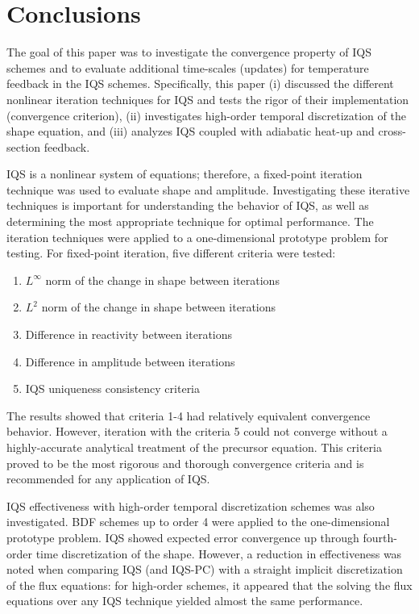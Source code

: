 \documentclass{elsarticle}
\newcommand{\iqspc}{IQS-PC\xspace}
\begin{document}
\section{Conclusions}

The goal of this paper was to investigate the convergence property of IQS schemes and to evaluate
additional time-scales (updates) for temperature feedback in the IQS schemes.  Specifically, this paper (i) discussed the different nonlinear iteration techniques for IQS and tests the rigor of their implementation (convergence criterion), (ii) investigates high-order temporal discretization of the shape equation, and (iii) analyzes IQS coupled with adiabatic heat-up and cross-section feedback.

IQS is a nonlinear system of equations; therefore, a fixed-point iteration technique was used to evaluate shape and amplitude. Investigating these iterative techniques is important for understanding the behavior of IQS, as well as determining the most appropriate technique for optimal performance. The iteration techniques were applied to a one-dimensional prototype problem for testing. For fixed-point iteration, five different criteria were tested: 
\begin{enumerate}
\item $L^\infty$ norm of the change in shape between iterations
\item $L^2$ norm of the change in shape between iterations
\item Difference in reactivity between iterations
\item Difference in amplitude between iterations
\item IQS uniqueness consistency criteria
\end{enumerate}
The results showed that criteria 1-4 had relatively equivalent convergence behavior. However, iteration with the criteria 5 could not converge without a highly-accurate analytical treatment of the precursor equation. This criteria proved to be the most rigorous and thorough convergence criteria and is recommended for any application of IQS.

IQS effectiveness with high-order temporal discretization schemes was also investigated. BDF schemes up to order 4 were applied to the one-dimensional prototype problem. IQS showed expected error convergence up through fourth-order time discretization of the shape. However,
a reduction in effectiveness was noted when comparing IQS (and \iqspc) with a straight implicit discretization of the flux equations: for high-order schemes, it appeared that the solving the flux equations over any IQS technique yielded 
almost the same performance.
\end{document}
